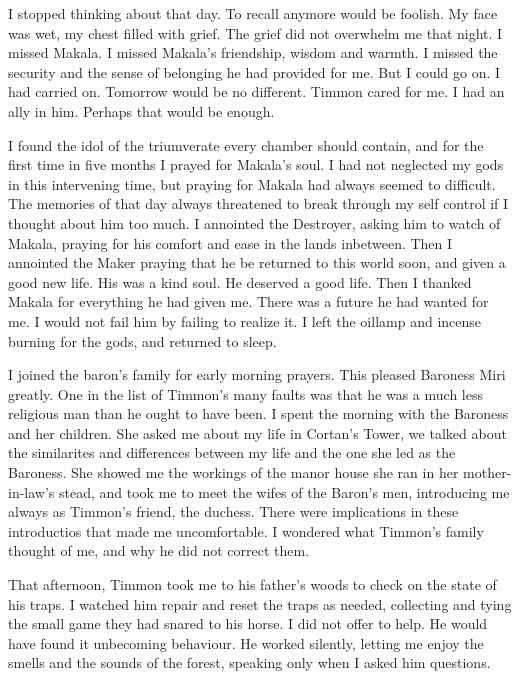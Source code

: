 \documentclass{article}
\begin{document}
I stopped thinking about that day. To recall anymore would be foolish. My face was wet, my chest filled with grief. The grief did not overwhelm me that night. I missed Makala. I missed Makala's friendship, wisdom and warmth. I missed the security and the sense of belonging he had provided for me. But I could go on. I had carried on. Tomorrow would be no different. Timmon cared for me. I had an ally in him. Perhaps that would be enough.

I found the idol of the triumverate every chamber should contain, and for the first time in five months I prayed for Makala's soul. I had not neglected my gods in this intervening time, but praying for Makala had always seemed to difficult. The memories of that day always threatened to break through my self control if I thought about him too much. I annointed the Destroyer, asking him to watch of Makala, praying for his comfort and ease in the lands inbetween. Then I annointed the Maker praying that he be returned to this world soon, and given a good new life. His was a kind soul. He deserved a good life. Then I thanked Makala for everything he had given me. There was a future he had wanted for me. I would not fail him by failing to realize it. I left the oillamp and incense burning for the gods, and returned to sleep.

\vspace{.5cm}

I joined the baron's family for early morning prayers. This pleased Baroness Miri greatly. One in the list of Timmon's many faults was that he was a much less religious man than he ought to have been. I spent the morning with the Baroness and her children. She asked me about my life in Cortan's Tower, we talked about the similarites and differences between my life and the one she led as the Baroness. She showed me the workings of the manor house she ran in her mother-in-law's stead, and took me to meet the wifes of the Baron's men, introducing me always as Timmon's friend, the duchess. There were implications in these introductios that made me uncomfortable. I wondered what Timmon's family thought of me, and why he did not correct them.

That afternoon, Timmon took me to his father's woods to check on the state of his traps. I watched him repair and reset the traps as needed, collecting and tying the small game they had snared to his horse. I did not offer to help. He would have found it unbecoming behaviour. He worked silently, letting me enjoy the smells and the sounds of the forest, speaking only when I asked him questions.
\end{document}
